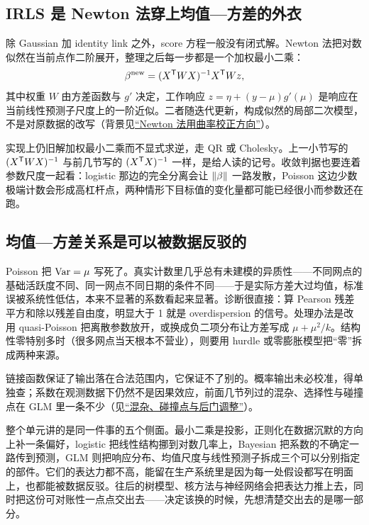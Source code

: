 \subsection{IRLS 是 Newton 法穿上均值—方差的外衣}

除 Gaussian 加 identity link 之外，score 方程一般没有闭式解。Newton 法把对数似然在当前点作二阶展开，整理之后每一步都是一个加权最小二乘：
\[
\beta^{\text{new}}=(X^{\mathsf{T}}WX)^{-1}X^{\mathsf{T}}Wz,
\]
其中权重 \(W\) 由方差函数与 \(g'\) 决定，工作响应 \(z=\eta+(y-\mu)g'(\mu)\) 是响应在当前线性预测子尺度上的一阶近似。二者随迭代更新，构成似然的局部二次模型，不是对原数据的改写（背景见\hyperref[sec:09-Convex-Optimization/06-Optimization-Algorithms/02]{``Newton 法用曲率校正方向''}）。

实现上仍旧解加权最小二乘而不显式求逆，走 QR 或 Cholesky。上一小节写的 \((X^{\mathsf{T}}WX)^{-1}\) 与前几节写的 \((X^{\mathsf{T}}X)^{-1}\) 一样，是给人读的记号。收敛判据也要连着参数尺度一起看：logistic 那边的完全分离会让 \(\left\lVert\beta\right\rVert\) 一路发散，Poisson 这边少数极端计数会形成高杠杆点，两种情形下目标值的变化量都可能已经很小而参数还在跑。

\subsection{均值—方差关系是可以被数据反驳的}

Poisson 把 \(\operatorname{Var}=\mu\) 写死了。真实计数里几乎总有未建模的异质性——不同网点的基础活跃度不同、同一网点不同日期的条件不同——于是实际方差大过均值，标准误被系统性低估，本来不显著的系数看起来显著。诊断很直接：算 Pearson 残差平方和除以残差自由度，明显大于 1 就是 overdispersion 的信号。处理办法是改用 quasi-Poisson 把离散参数放开，或换成负二项分布让方差写成 \(\mu+\mu^2/k\)。结构性零特别多时（很多网点当天根本不营业），则要用 hurdle 或零膨胀模型把``零''拆成两种来源。

链接函数保证了输出落在合法范围内，它保证不了别的。概率输出未必校准，得单独查；系数在观测数据下仍然不是因果效应，前面几节列过的混杂、选择性与碰撞点在 GLM 里一条不少（见\hyperref[sec:13-Machine-Learning/12-Causal-Inference/03]{``混杂、碰撞点与后门调整''}）。

整个单元讲的是同一件事的五个侧面。最小二乘是投影，正则化在数据沉默的方向上补一条偏好，logistic 把线性结构挪到对数几率上，Bayesian 把系数的不确定一路传到预测，GLM 则把响应分布、均值尺度与线性预测子拆成三个可以分别指定的部件。它们的表达力都不高，能留在生产系统里是因为每一处假设都写在明面上，也都能被数据反驳。往后的树模型、核方法与神经网络会把表达力推上去，同时把这份可对账性一点点交出去——决定该换的时候，先想清楚交出去的是哪一部分。

